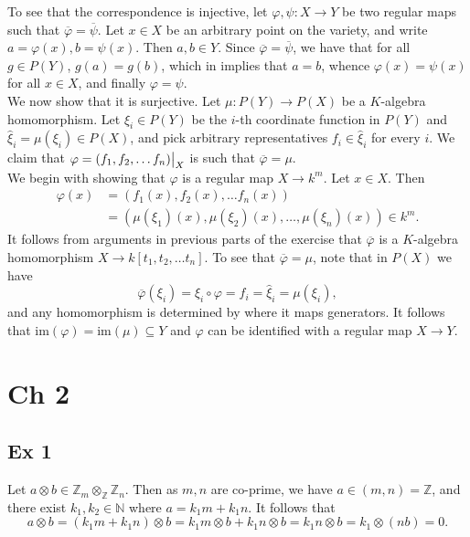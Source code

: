 \documentclass{article}
\let\temp\phi
\let\phi\varphi
\let\varphi\temp
\newcommand\restr[2]{{%
  \left.\kern-\nulldelimiterspace %
  #1 %
  \vphantom{\big|} %
  \right|_{#2} %
  }}
\theoremstyle{definition}
\newcommand{\N}{\mathbb{N}}
\newcommand{\Z}{\mathbb{Z}}
\newcommand{\im}{\text{im}}
\begin{document}
To see that the correspondence is injective, let $\phi, \psi : X \to Y$ be two
regular maps such that $\overline{\phi} = \overline{\psi}$. Let $x \in X$ be an
arbitrary point on the variety, and write $a = \phi(x), b = \psi(x)$. Then $a,
b \in Y$. Since $\overline{\phi} = \overline{\psi}$, we have that for all $g
\in P(Y)$, $g(a) = g(b)$, which in implies that $a = b$, whence $\phi(x) =
\psi(x)$ for all $x \in X$, and finally $\phi = \psi$. \\

We now show that it is surjective. Let $\mu : P(Y) \to P(X)$ be a $K$-algebra
homomorphism. Let $\xi_i \in P(Y)$ be the $i$-th coordinate function in
$P(Y)$ and $\hat{\xi}_i = \mu(\xi_i) \in P(X)$, and pick arbitrary
representatives $f_i \in \hat{\xi}_i$ for every $i$. We claim that $\phi =
\restr{(f_1, f_2, \ldots f_n)}{X}$ is such that $\overline{\phi} = \mu$. \\ 

We begin with showing that $\phi$ is a regular map $X \to k^{m}$. Let $x \in X$.
Then 
\begin{align*}
	\phi(x) 
	&= 
	(f_1(x), f_2(x), \ldots f_n(x)) \\
	&= 
	(\mu(\xi_1)(x), \mu(\xi_2)(x), \ldots, \mu(\xi_n)(x)) \in k^{m}.
\end{align*}
It follows from arguments in previous parts of the exercise that
$\overline{\phi}$ is a $K$-algebra homomorphism $X \to k[t_1, t_2, \ldots t_n]$. To see that $\overline{\phi} =
\mu$, note that in $P(X)$ we have
\[
\overline{\phi}(\xi_i) = \xi_i \circ \phi = f_i = \hat{\xi}_i = \mu(\xi_i),
\] 
and any homomorphism is determined by where it maps generators. It follows that
$\im(\phi) = \im(\mu) \subseteq Y$ and $\phi$ can be identified with a regular map $X \to
Y$.


\section*{Ch 2}

\subsection*{Ex 1}
Let $a \otimes b \in \Z_m \otimes_{\Z} \Z_n$. Then as $m, n$ are co-prime, we have $a \in (m, n) = \Z$, and
there exist $k_1, k_2 \in \N$ where $a = k_1 m + k_1 n$. It follows that 
\[
a \otimes b 
= 
(k_1 m + k_1 n) \otimes b
= 
k_1 m \otimes b + k_1 n \otimes b
= 
k_1 n \otimes b
= 
k_1 \otimes (n b)
= 
0.
\] 
\end{document}
